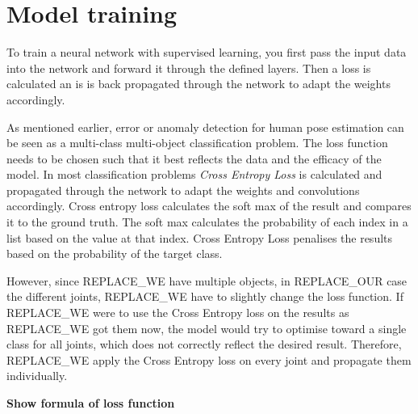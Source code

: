 \section{Model training}
\label{sec:model_training}

To train a neural network with supervised learning, you first pass the input data into the network and forward it through the defined layers. Then a loss is calculated an is is back propagated through the network to adapt the weights accordingly. 

As mentioned earlier, error or anomaly detection for human pose estimation can be seen as a multi-class multi-object classification problem. The loss function needs to be chosen such that it best reflects the data and the efficacy of the model. In most classification problems \textit{Cross Entropy Loss} is calculated and propagated through the network to adapt the weights and convolutions accordingly. Cross entropy loss calculates the soft max of the result and compares it to the ground truth. The soft max calculates the probability of each index in a list based on the value at that index. Cross Entropy Loss penalises the results based on the probability of the target class.

However, since REPLACE_WE have multiple objects, in REPLACE_OUR case the different joints, REPLACE_WE have to slightly change the loss function. If REPLACE_WE were to use the Cross Entropy loss on the results as REPLACE_WE got them now, the model would try to optimise toward a single class for all joints, which does not correctly reflect the desired result. Therefore, REPLACE_WE apply the Cross Entropy loss on every joint and propagate them individually.

\textbf{Show formula of loss function}
